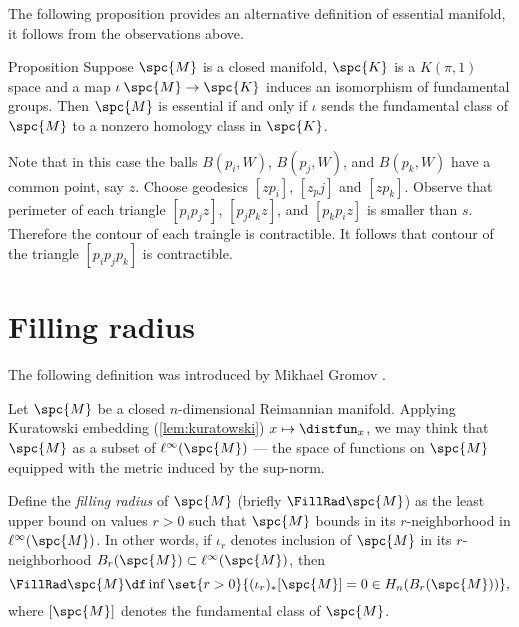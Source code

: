 The following proposition provides an alternative definition of essential manifold, it follows from the observations above.

\begin{thm}{Proposition}
Suppose $\spc{M}$ is a closed manifold, 
$\spc{K}$ is a $K(\pi,1)$ space and a map $\iota\:\spc{M}\to \spc{K}$ induces an isomorphism of fundamental groups.
Then $\spc{M}$ is essential if and only if $\iota$ sends the fundamental class of $\spc{M}$ to a nonzero homology class in $\spc{K}$.
\end{thm}















Note that in this case the balls $B(p_i,W)$, $B(p_j,W)$, and $B(p_k,W)$
have a common point, say $z$.
Choose geodesics $[zp_i]$, $[z_pj]$ and $[zp_k]$.
Observe that perimeter of each triangle $[p_ip_jz]$, $[p_jp_kz]$, and $[p_kp_iz]$ is smaller than $s$.
Therefore the contour of each traingle is contractible.
It follows that contour of the triangle $[p_ip_jp_k]$ is contractible.













\section{Filling radius}

The following definition was introduced by Mikhael Gromov \cite{gromov-1983}.

Let $\spc{M}$ be a closed $n$-dimensional Reimannian manifold.
Applying Kuratowski embedding (\ref{lem:kuratowski}) $x\mapsto \distfun_x$, we may think that $\spc{M}$ as a subset of $\ell^\infty(\spc{M})$ --- the space of functions on $\spc{M}$ equipped with the metric induced by the sup-norm.

Define the \emph{filling radius} of $\spc{M}$ (briefly $\FillRad\spc{M}$) as the least upper bound on values $r>0$ such that $\spc{M}$ bounds in its $r$-neighborhood in $\ell^\infty(\spc{M})$.
In other words, if $\iota_r$ denotes inclusion of $\spc{M}$ in its $r$-neighborhood $B_r(\spc{M})\subset \ell^\infty(\spc{M})$,
then 
\[\FillRad\spc{M}\df\inf\set{r>0}{(\iota_r)_*[\spc{M}]=0\in H_n(B_r(\spc{M}))},\]
where $[\spc{M}]$ denotes the fundamental class of $\spc{M}$.

